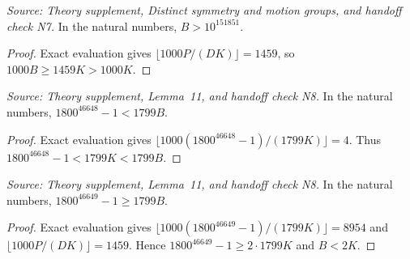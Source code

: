 \begin{lemma}
  \label{lem:n7-color-count}
  \leanok
  \textit{Source: Theory supplement, Distinct symmetry and motion groups, and handoff check N7.}
  In the natural numbers, \(B>10^{151851}\).
\end{lemma}
\begin{proof}
  \leanok
  Exact evaluation gives \(\lfloor 1000P/(DK)\rfloor=1459\), so
  \(1000B\ge1459K>1000K\).
\end{proof}

\begin{lemma}
  \label{lem:n8-radius-lower}
  \leanok
  \textit{Source: Theory supplement, Lemma~11, and handoff check N8.}
  In the natural numbers, \(1800^{46648}-1<1799B\).
\end{lemma}
\begin{proof}
  \leanok
  Exact evaluation gives
  \(\lfloor1000(1800^{46648}-1)/(1799K)\rfloor=4\).
  Thus \(1800^{46648}-1<1799K<1799B\).
\end{proof}

\begin{lemma}
  \label{lem:n8-radius-cross-check}
  \leanok
  \textit{Source: Theory supplement, Lemma~11, and handoff check N8.}
  In the natural numbers, \(1800^{46649}-1\ge1799B\).
\end{lemma}
\begin{proof}
  \leanok
  Exact evaluation gives
  \(\lfloor1000(1800^{46649}-1)/(1799K)\rfloor=8954\) and
  \(\lfloor1000P/(DK)\rfloor=1459\). Hence
  \(1800^{46649}-1\ge 2\cdot1799K\) and \(B<2K\).
\end{proof}

